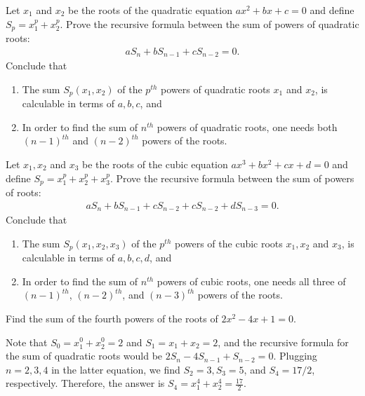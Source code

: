 \begin{tcolorbox}[title={Sum $S_p$ of Powers of Quadratic \& Cubic Roots}]
\begin{question}[name={Sum of Powers of Quadratic Roots}]\label{p:sum-of-powers-quadratic}
    Let $x_1$ and $x_2$ be the roots of the quadratic equation $ax^2+bx+c=0$ and define $S_p=x_1^p+x_2^p$. Prove the recursive formula between the sum of powers of quadratic roots:
    \begin{align*}
        aS_n + bS_{n-1} + cS_{n-2} = 0.
    \end{align*}
    Conclude that
    \begin{enumerate}
        \item The sum $S_p(x_1,x_2)$ of the $p^{th}$ powers of quadratic roots $x_1$ and $x_2$, is calculable in terms of $a,b,c$, and
        \item In order to find the sum of $n^{th}$ powers of quadratic roots, one needs both $(n-1)^{th}$ and $(n-2)^{th}$ powers of the roots.
    \end{enumerate}
\end{question}

\begin{question}[name={Sum of Powers of Cubic Roots}]\label{p:sum-of-powers-cubic}
    Let $x_1,x_2$ and $x_3$ be the roots of the cubic equation $ax^3+bx^2+cx+d=0$ and define $S_p=x_1^p+x_2^p+x_3^p$. Prove the recursive formula between the sum of powers of roots:
    \begin{align*}
        aS_n + bS_{n-1} + cS_{n-2} + cS_{n-2} + dS_{n-3} = 0.
    \end{align*}
    Conclude that
    \begin{enumerate}
        \item The sum $S_p(x_1,x_2,x_3)$ of the $p^{th}$ powers of the cubic roots $x_1,x_2$ and $x_3$, is calculable in terms of $a,b,c, d$, and
        \item In order to find the sum of $n^{th}$ powers of cubic roots, one needs all three of $(n-1)^{th}$, $(n-2)^{th}$, and $(n-3)^{th}$ powers of the roots.
    \end{enumerate}
\end{question}
\end{tcolorbox}

\begin{question}
    Find the sum of the fourth powers of the roots of $2x^2-4x+1=0$.
\end{question}

\begin{solution}
    Note that $S_0=x_1^0+x_2^0=2$ and $S_1=x_1+x_2=2$, and the recursive formula for the sum of quadratic roots would be $2S_n-4S_{n-1}+S_{n-2}=0$. Plugging $n=2,3,4$ in the latter equation, we find $S_2=3, S_3=5$, and $S_4=17/2$, respectively. Therefore, the answer is $S_4=x_1^4+x_2^4=\frac{17}{2}$.
\end{solution}


